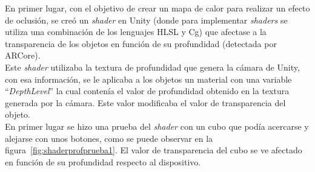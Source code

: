 
En primer lugar, con el objetivo de crear un mapa de calor para realizar un efecto de oclusión, se creó un \textit{shader} en Unity (donde para implementar \textit{shaders} se utiliza una combinación de los lenguajes HLSL y Cg) que afectase a la transparencia de los objetos en función de su profundidad (detectada por ARCore).\\


Este \textit{shader} utilizaba la textura de profundidad que genera la cámara de Unity\footnotemark, con esa información, se le aplicaba a los objetos un material con una variable ``\textit{DepthLevel}'' la cual contenía el valor de profundidad obtenido en la textura generada por la cámara. Este valor modificaba el valor de transparencia del objeto.\\

En primer lugar se hizo una prueba del \textit{shader} con un cubo que podía acercarse y alejarse con unos botones, como se puede observar en la figura~\ref{fig:shaderprofprueba1}. El valor de transparencia del cubo se ve afectado en función de su profundidad respecto al dispositivo.\\


